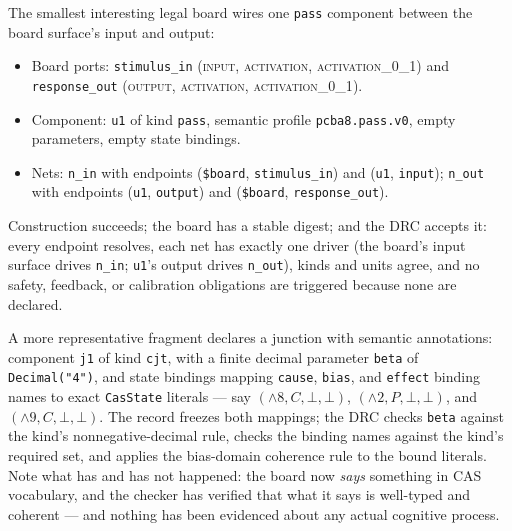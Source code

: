 \begin{example}\label{ch05:ex:legal}
The smallest interesting legal board wires one \texttt{pass} component
between the board surface's input and output:

\begin{itemize}
\item Board ports: \texttt{stimulus\_in} (\textsc{input},
\textsc{activation}, \textsc{activation\_0\_1}) and
\texttt{response\_out} (\textsc{output}, \textsc{activation},
\textsc{activation\_0\_1}).
\item Component: \texttt{u1} of kind \texttt{pass}, semantic profile
\texttt{pcba8.pass.v0}, empty parameters, empty state bindings.
\item Nets: \texttt{n\_in} with endpoints
(\texttt{\$board}, \texttt{stimulus\_in}) and (\texttt{u1},
\texttt{input}); \texttt{n\_out} with endpoints (\texttt{u1},
\texttt{output}) and (\texttt{\$board}, \texttt{response\_out}).
\end{itemize}

Construction succeeds; the board has a stable digest; and the DRC
accepts it: every endpoint resolves, each net has exactly one driver
(the board's input surface drives \texttt{n\_in}; \texttt{u1}'s output
drives \texttt{n\_out}), kinds and units agree, and no safety, feedback,
or calibration obligations are triggered because none are declared.
\end{example}

\begin{example}\label{ch05:ex:cjt}
A more representative fragment declares a junction with semantic
annotations: component \texttt{j1} of kind \texttt{cjt}, with a finite
decimal parameter \texttt{beta} of \texttt{Decimal("4")}, and state
bindings mapping \texttt{cause}, \texttt{bias}, and \texttt{effect}
binding names to exact \texttt{CasState} literals --- say
$({\wedge}8, C, \bot, \bot)$, $({\wedge}2, P, \bot, \bot)$, and
$({\wedge}9, C, \bot, \bot)$. The record freezes both mappings; the DRC
checks \texttt{beta} against the kind's nonnegative-decimal rule, checks
the binding names against the kind's required set, and applies the
bias-domain coherence rule to the bound literals. Note what has and has
not happened: the board now \emph{says} something in CAS vocabulary, and
the checker has verified that what it says is well-typed and coherent
--- and nothing has been evidenced about any actual cognitive process.
\end{example}

